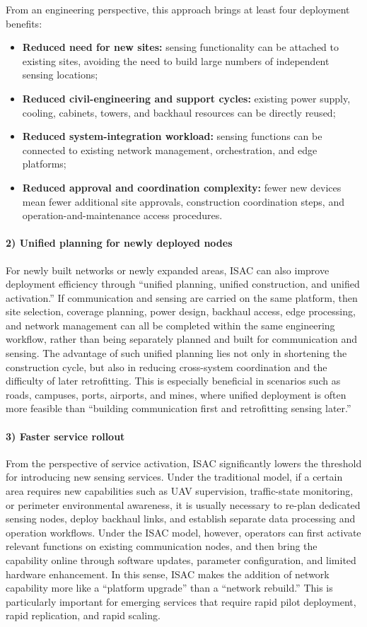 From an engineering perspective, this approach brings at least four deployment benefits:
\begin{itemize}
    \item \textbf{Reduced need for new sites:} sensing functionality can be attached to existing sites, avoiding the need to build large numbers of independent sensing locations;
    \item \textbf{Reduced civil-engineering and support cycles:} existing power supply, cooling, cabinets, towers, and backhaul resources can be directly reused;
    \item \textbf{Reduced system-integration workload:} sensing functions can be connected to existing network management, orchestration, and edge platforms;
    \item \textbf{Reduced approval and coordination complexity:} fewer new devices mean fewer additional site approvals, construction coordination steps, and operation-and-maintenance access procedures.
\end{itemize}

\paragraph{2) Unified planning for newly deployed nodes}
For newly built networks or newly expanded areas, ISAC can also improve deployment efficiency through ``unified planning, unified construction, and unified activation.'' If communication and sensing are carried on the same platform, then site selection, coverage planning, power design, backhaul access, edge processing, and network management can all be completed within the same engineering workflow, rather than being separately planned and built for communication and sensing.  
The advantage of such unified planning lies not only in shortening the construction cycle, but also in reducing cross-system coordination and the difficulty of later retrofitting. This is especially beneficial in scenarios such as roads, campuses, ports, airports, and mines, where unified deployment is often more feasible than ``building communication first and retrofitting sensing later.''

\paragraph{3) Faster service rollout}
From the perspective of service activation, ISAC significantly lowers the threshold for introducing new sensing services. Under the traditional model, if a certain area requires new capabilities such as UAV supervision, traffic-state monitoring, or perimeter environmental awareness, it is usually necessary to re-plan dedicated sensing nodes, deploy backhaul links, and establish separate data processing and operation workflows. Under the ISAC model, however, operators can first activate relevant functions on existing communication nodes, and then bring the capability online through software updates, parameter configuration, and limited hardware enhancement. In this sense, ISAC makes the addition of network capability more like a ``platform upgrade'' than a ``network rebuild.'' This is particularly important for emerging services that require rapid pilot deployment, rapid replication, and rapid scaling.

